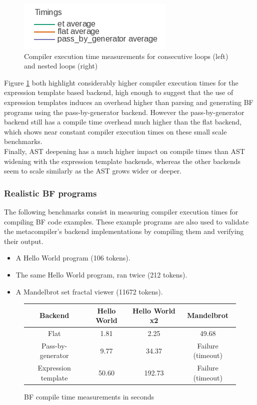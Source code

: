 \documentclass[../../../main]{subfiles}
\begin{document}
\begin{figure}
\includegraphics[scale=0.5]{images/bf-graph-legend.png}
\caption{
  Compiler execution time measurements for consecutive loops (left) and nested loops (right)
}\label{fig:bf-bench}
\end{figure}

Figure \ref{fig:bf-bench}
both highlight considerably higher compiler execution times for the expression
template based backend, high enough to suggest that the use of expression
templates induces an overhead higher than parsing and generating BF programs
using the pass-by-generator backend. However the pass-by-generator backend still
has a compile time overhead much higher than the flat backend, which shows near
constant compiler execution times on these small scale benchmarks.\\

Finally, AST deepening has a much higher impact on compile times than AST
widening with the expression template backends, whereas the other backends seem
to scale similarly as the AST grows wider or deeper.

\subsubsection{Realistic BF programs}

The following benchmarks consist in measuring compiler execution times for
compiling BF code examples. These example programs are also used to validate the
metacompiler's backend implementations by compiling them and verifying their
output.

\begin{itemize}
\item A Hello World program (106 tokens).
\item The same Hello World program, ran twice (212 tokens).
\item A Mandelbrot set fractal viewer (11672 tokens).
\end{itemize}

\begin{figure}
\begin{tabular}{|c|c|c|c|}
\hline
Backend             & Hello World & Hello World x2  & Mandelbrot \\
\hline
Flat                & 1.81        & 2.25            & 49.68 \\
Pass-by-generator   & 9.77        & 34.37           & Failure (timeout) \\
Expression template & 50.60       & 192.73          & Failure (timeout) \\
\hline
\end{tabular}
\caption{BF compile time measurements in seconds
}\label{fig:BF-compile-times}
\end{figure}
\end{document}
